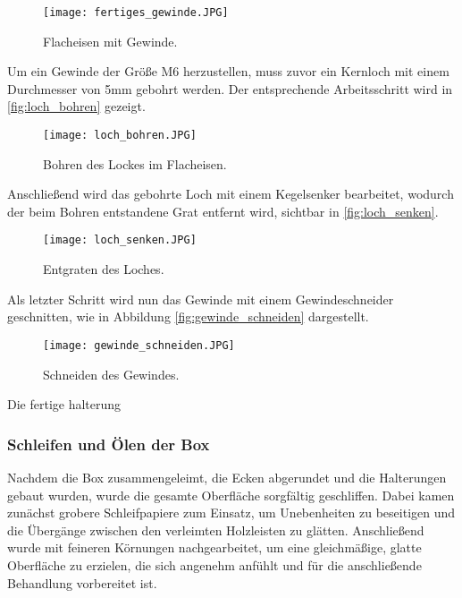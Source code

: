 \begin{figure}[H]
    \centering
    \texttt{[image: fertiges\_gewinde.JPG]}
    \caption{Flacheisen mit Gewinde.}
    \label{fig:fertiges_gewinde}
\end{figure}

Um ein Gewinde der Größe M6 herzustellen, muss zuvor ein Kernloch mit einem
Durchmesser von 5mm gebohrt werden. Der entsprechende Arbeitsschritt wird in
\autoref{fig:loch_bohren} gezeigt.

\begin{figure}[H]
    \centering
    \texttt{[image: loch\_bohren.JPG]}
    \caption{Bohren des Lockes im Flacheisen.}
    \label{fig:loch_bohren}
\end{figure}

\newpage

Anschließend wird das gebohrte Loch mit einem Kegelsenker bearbeitet, wodurch
der beim Bohren entstandene Grat entfernt wird, sichtbar in \autoref{fig:loch_senken}.

\begin{figure}[H]
    \centering
    \texttt{[image: loch\_senken.JPG]}
    \caption{Entgraten des Loches.}
    \label{fig:loch_senken}
\end{figure}

Als letzter Schritt wird nun das Gewinde mit einem Gewindeschneider geschnitten,
wie in Abbildung \autoref{fig:gewinde_schneiden} dargestellt.

\begin{figure}[H]
    \centering
    \texttt{[image: gewinde\_schneiden.JPG]}
    \caption{Schneiden des Gewindes.}
    \label{fig:gewinde_schneiden}
\end{figure}

\newpage

Die fertige halterung 


\subsubsection{Schleifen und Ölen der Box}

Nachdem die Box zusammengeleimt, die Ecken abgerundet und die Halterungen
gebaut wurden, wurde die gesamte Oberfläche sorgfältig geschliffen.
Dabei kamen zunächst grobere Schleifpapiere zum Einsatz, um Unebenheiten zu
beseitigen und die Übergänge zwischen den verleimten Holzleisten zu glätten.
Anschließend wurde mit feineren Körnungen nachgearbeitet, um eine gleichmäßige,
glatte Oberfläche zu erzielen, die sich angenehm anfühlt und für die
anschließende Behandlung vorbereitet ist.

